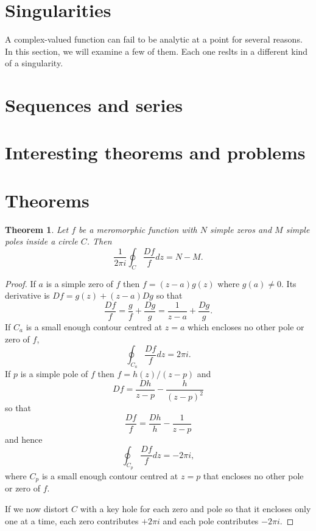\documentclass{article}
\theoremstyle{plain}
\newtheorem{thm}{Theorem}
\numberwithin{thm}{section}
\theoremstyle{plain}
\numberwithin{prop}{section}
\theoremstyle{plain}
\numberwithin{prop}{section}
\theoremstyle{definition}
\numberwithin{defn}{section}
\theoremstyle{remark}
\numberwithin{equation}{section}
\begin{document}
\section{Singularities}\label{s5}
A complex-valued function can fail to be analytic at a point for several reasons.
In this section, we will examine a few of them. Each one reslts in a different
kind of a singularity.


\section{Sequences and series}\label{s6}

\section{Interesting theorems and problems}\label{s1a}
\section{Theorems}
\begin{thm}\label{s1at1}
Let $f$ be a meromorphic function with $N$ simple zeros and $M$ simple poles
inside a circle $C$. Then
\[
\frac{1}{2\pi i}\oint_C \frac{Df}{f}dz = N - M.
\]
\end{thm}
\begin{proof}
If $a$ is a simple zero of $f$ then $f = (z - a)g(z)$ where $g(a) \ne 0$. Its
derivative is $Df = g(z) + (z - a)Dg$ so that
\[
\frac{Df}{f} = \frac{g}{f} + \frac{Dg}{g} = \frac{1}{z - a} + \frac{Dg}{g}.
\]
If $C_a$ is a small enough contour centred at $z = a$ which encloses no other
pole or zero of $f$,
\[
\oint_{C_a}\frac{Df}{f}dz = 2\pi i.
\]
If $p$ is a simple pole of $f$ then $f = h(z)/(z - p)$ and 
\[
Df = \frac{Dh}{z - p} - \frac{h}{(z - p)^2}
\]
so that
\[
\frac{Df}{f} = \frac{Dh}{h} - \frac{1}{z - p}
\]
and hence
\[
\oint_{C_p}\frac{Df}{f}dz = -2\pi i,
\]
where $C_p$ is a small enough contour centred at $z = p$ that encloses no other
pole or zero of $f$.

If we now distort $C$ with a key hole for each zero and pole so that it encloses
only one at a time, each zero contributes $+2\pi i$ and each pole contributes
$-2\pi i$.
\end{proof}
\end{document}
